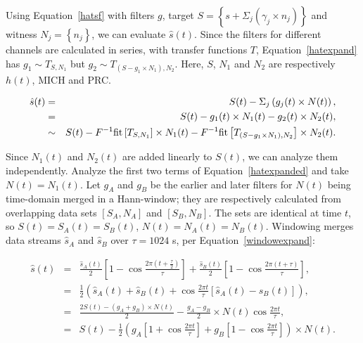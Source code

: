 Using Equation~\ref{hatsf} with filters $g$, target $S = \left\{ s + \Sigma_j \left(\gamma_j \times n_j\right)\right\}$ and witness $N_j = \left\{ n_{j} \right\}$, we can evaluate  $\hat{s} (t)$. Since the filters for different channels are calculated in series, with transfer functions $T$, Equation~\ref{hatexpand} has $g_1 \sim T_{S,N_1}$ but $g_2 \sim T_{\left( S-g_1 \times N_1 \right),N_2}$. Here, $S$, $N_1$ and $N_2$ are respectively $h(t)$, MICH and PRC.

            \begin{eqnarray}
            \hat{s} (t) &=& S (t) - \Sigma_j \left(g_{j} (t) \times N (t)\right) \label{hatexpand}, \\
		&=& S (t) - g_1 (t) \times N_1 (t) - g_2 (t) \times N_2 (t) \label{hatexpanded},\\
&\sim& S (t) - F^{-1} \textup{fit}\left[ T_{S,N_1} \right] \times N_1 (t) - F^{-1} \textup{fit}\left[T_{\left( S-g_1 \times N_1 \right),N_2} \right] \times N_2 (t).
            \end{eqnarray} 
		

	Since $N_1(t)$ and $N_2(t)$ are added linearly to $S(t)$, we can analyze them independently. 
Analyze the first two terms of Equation~\ref{hatexpanded} and take $N(t) = N_1(t)$. Let $g_{A}$ and $g_{B}$ be the earlier and later filters for $N(t)$ being time-domain merged in a Hann-window; they are respectively calculated from overlapping data sets $[S_A, N_A]$ and $[S_B, N_B]$. The sets are identical at time $t$, so $S(t)=S_A(t) = S_B(t)$, $N(t)=N_A(t) = N_B(t)$. Windowing merges data streams $\hat{s}_A$ and $\hat{s}_B$ over $\tau = 1024$ s, per Equation~\ref{windowexpand}: 

	\begin{eqnarray}
        \hat{s} (t) &=& \frac{\hat{s}_A (t)}{2} \left[1 - \cos \frac{2 \pi (t+\frac{\tau}{2})}{\tau} \right] + \frac{\hat{s}_B (t)}{2}\left[1 - \cos \frac{2 \pi (t+\tau)}{\tau} \right] \label{windowexpand}, \\
	  &=& \frac{1}{2} \left( \hat{s}_A (t) + \hat{s}_B (t) + \cos \frac{2 \pi t}{\tau} \left[\hat{s}_A (t) - \hat{s}_B (t) \right]\right),\\
	&=& \frac{2 S(t) - (g_{A} + g_{B})\times N(t)}{2} - \frac{g_{A} - g_{B}}{2} \times N(t) \cos \frac{2 \pi t}{\tau},\\
          &=& S(t) - \frac{1}{2} \left( g_{A} \left [1 + \cos \frac{2 \pi t}{\tau} \right] + g_{B} \left [1 - \cos \frac{2 \pi t}{\tau} \right] \right) \times N (t) \label{windowexpanded}.
	\end{eqnarray}

